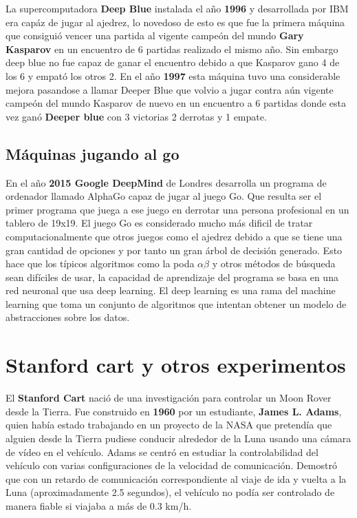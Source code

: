 \documentclass[a4paper, 11pt]{article} %
\begin{document}
La supercomputadora \textbf{Deep Blue} instalada el año \textbf{1996} y desarrollada por IBM era capáz de jugar al ajedrez, lo novedoso de esto es que fue la primera máquina que consiguió vencer una partida al vigente campeón del mundo \textbf{Gary Kasparov} en un encuentro de 6 partidas realizado el mismo año. Sin embargo deep blue no fue capaz de ganar el encuentro debido a que Kasparov gano 4 de los 6 y empató los otros 2. En el año \textbf{1997} esta máquina tuvo una considerable mejora pasandose a llamar Deeper Blue que volvio a jugar contra aún vigente campeón del mundo Kasparov de nuevo en un encuentro a 6 partidas donde esta vez ganó \textbf{Deeper blue} con 3 victorias 2 derrotas y 1 empate.

\subsection{Máquinas jugando al go}

En el año \textbf{2015 Google DeepMind} de Londres desarrolla un programa de ordenador llamado AlphaGo capaz de jugar al juego Go. Que resulta ser el primer programa que juega a ese juego en derrotar una persona profesional en un tablero de 19x19. El juego Go es considerado mucho más dificil de tratar computacionalmente que otros juegos como el ajedrez debido a que se tiene una gran cantidad de opciones y por tanto un gran árbol de decisión generado. Esto hace que los típicos algoritmos como la poda $\alpha\beta$ y otros métodos de búsqueda sean difíciles de usar, la capacidad de aprendizaje del programa se basa en una red neuronal que usa deep learning. El deep learning es una rama del machine learning que toma un conjunto de algoritmos que intentan obtener un modelo de abstracciones sobre los datos.

\section{Stanford cart y otros experimentos}
El \textbf{Stanford Cart} nació de una investigación para controlar un Moon Rover desde la Tierra. Fue construido en \textbf{1960} por un estudiante, \textbf{James L. Adams}, quien había estado trabajando en un proyecto de la NASA que pretendía que alguien desde la Tierra pudiese conducir alrededor de la Luna usando una cámara de vídeo en el vehículo.
Adams se centró en estudiar la controlabilidad del vehículo con varias configuraciones de la velocidad de comunicación. Demostró que con un retardo de comunicación correspondiente al viaje de ida y vuelta a la Luna (aproximadamente 2.5 segundos), el vehículo no podía ser controlado de manera fiable si viajaba a más de 0.3 km/h.
\end{document}
